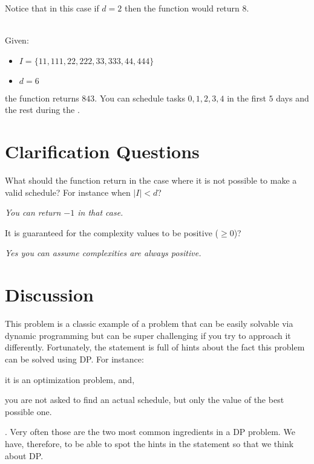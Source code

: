 \begin{exercise}
\begin{example}
        Notice that in this case if $d = 2$ then the function would return $8$.
    \end{example}

    \begin{example}
        \hfill \\
        Given:
        \begin{itemize}
            \item $I = \{11,111,22,222,33,333,44,444\}$
            \item $d = 6$
        \end{itemize}
        the function returns $843$. You can schedule tasks $0,1,2,3,4$ in the first $5$ days and the
        rest during the .
        
    \end{example}
\end{exercise}



\section{Clarification Questions}
        
    \begin{QandA}
            \item What should the function return in the case where it is not possible to make a
            valid schedule? For instance when $|I| < d$?
        \begin{answered}
            \textit{You can return $-1$ in that case.}
        \end{answered}

        \item It is guaranteed for the complexity values to be positive ($\geq 0$)?
        \begin{answered}
            \textit{Yes you can assume complexities are always positive.}
        \end{answered}
    \end{QandA}

\section{Discussion}
\label{min_difficulty_job_scheduler:sec:discussion}
This problem is a classic example of a problem that can be easily solvable via dynamic programming
but can be super challenging if you try to approach it differently. Fortunately, the statement is
full of hints about the fact this problem can be solved using DP. For instance:
\begin{enumerate*}
    \item it is an optimization problem, and,
    \item you are not asked to find an actual schedule, but only the value of the best possible one.
\end{enumerate*}. Very often those are the two most common ingredients in a DP problem. We have,
therefore, to be able to spot the hints in the statement so that we think about DP.



